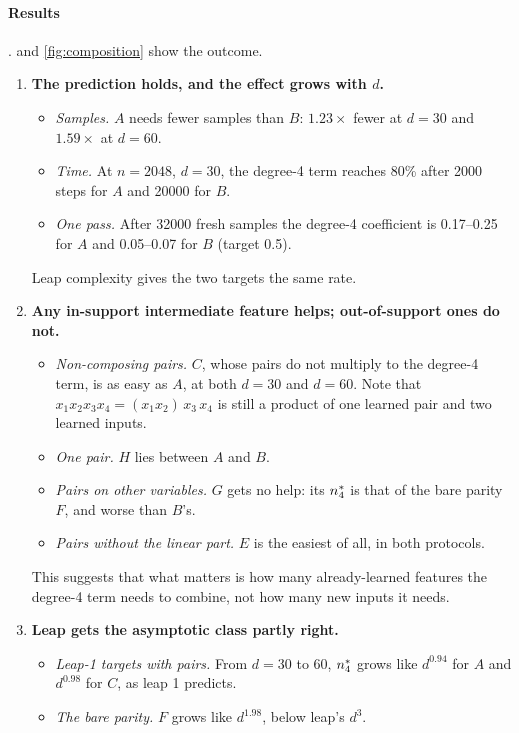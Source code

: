 \paragraph{Results} .  and \cref{fig:composition} show the outcome.
\begin{enumerate}
\item \textbf{The prediction holds, and the effect grows with $d$.}
  \begin{itemize}
  \item \emph{Samples.} $A$ needs fewer samples than $B$: $1.23\times$ fewer at $d=30$ and $1.59\times$ at $d=60$.
  \item \emph{Time.} At $n=2048$, $d=30$, the degree-4 term reaches 80\% after 2000 steps for $A$ and 20000 for $B$.
  \item \emph{One pass.} After 32000 fresh samples the degree-4 coefficient is 0.17–0.25 for $A$ and 0.05–0.07 for $B$ (target 0.5).
  \end{itemize}
  Leap complexity gives the two targets the same rate.
\item \textbf{Any in-support intermediate feature helps; out-of-support ones do not.}
  \begin{itemize}
  \item \emph{Non-composing pairs.} $C$, whose pairs do not multiply to the degree-4 term, is as easy as $A$, at both $d=30$ and $d=60$. Note that $x_1x_2x_3x_4=(x_1x_2)\,x_3\,x_4$ is still a product of one learned pair and two learned inputs.
  \item \emph{One pair.} $H$ lies between $A$ and $B$.
  \item \emph{Pairs on other variables.} $G$ gets no help: its $n^{*}_4$ is that of the bare parity $F$, and worse than $B$'s.
  \item \emph{Pairs without the linear part.} $E$ is the easiest of all, in both protocols.
  \end{itemize}
  This suggests that what matters is how many already-learned features the degree-4 term needs to combine, not how many new inputs it needs.
\item \textbf{Leap gets the asymptotic class partly right.}
  \begin{itemize}
  \item \emph{Leap-1 targets with pairs.} From $d=30$ to $60$, $n^{*}_4$ grows like $d^{0.94}$ for $A$ and $d^{0.98}$ for $C$, as leap 1 predicts.
  \item \emph{The bare parity.} $F$ grows like $d^{1.98}$, below leap's $d^3$.

\end{itemize}
\end{enumerate}
